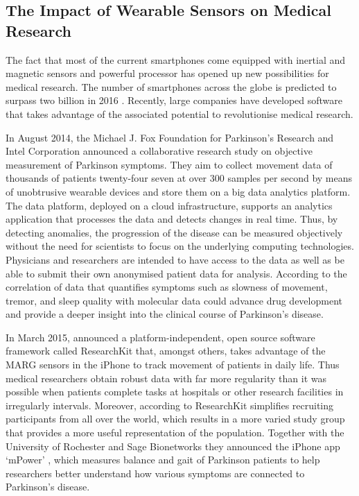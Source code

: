 \subsection{The Impact of Wearable Sensors on Medical Research}

The fact that most of the current smartphones come equipped with inertial and magnetic sensors and powerful processor has opened up new possibilities for medical research. The number of smartphones across the globe is predicted to surpass two billion in 2016 \cite{emarketer_smartphones}. Recently, large companies have developed software that takes advantage of the associated potential to revolutionise medical research.

In August 2014, the Michael J. Fox Foundation for Parkinson’s Research and Intel Corporation \cite{Intel_2013} announced a collaborative research study on objective measurement of Parkinson symptoms. They aim to collect movement data of thousands of patients twenty-four seven at over 300 samples per second by means of unobtrusive wearable devices and store them on a big data analytics platform. The data platform, deployed on a cloud infrastructure, supports an analytics application that processes the data and detects changes in real time. Thus, by detecting anomalies, the progression of the disease can be measured objectively without the need for scientists to focus on the underlying computing technologies. Physicians and researchers are intended to have access to the data as well as be able to submit their own anonymised patient data for analysis. According to \cite{Intel_2013} the correlation of data that quantifies symptoms such as slowness of movement, tremor, and sleep quality with molecular data could advance drug development and provide a deeper insight into the clinical course of Parkinson's disease.

In March 2015, \citeauthor{Apple_2015} announced a platform-independent, open source software framework called ResearchKit \cite{Apple_2015} that, amongst others, takes advantage of the MARG sensors in the iPhone to track movement of patients in daily life. Thus medical researchers obtain robust data with far more regularity than it was possible when patients complete tasks at hospitals or other research facilities in irregularly intervals. Moreover, according to \citeauthor{Apple_2015} ResearchKit simplifies recruiting participants from all over the world, which results in a more varied study group that provides a more useful representation of the population. Together with the University of Rochester and Sage Bionetworks they announced the iPhone app `mPower' \cite{mpower}, which measures balance and gait of Parkinson patients to help researchers better understand how various symptoms are connected to Parkinson's disease.

